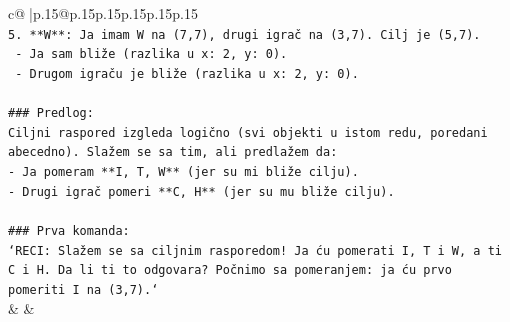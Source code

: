 \documentclass{article}
\begin{document}
{\begin{supertabular}{c@{$\;$}|p{.15\linewidth}@{}p{.15\linewidth}p{.15\linewidth}p{.15\linewidth}p{.15\linewidth}p{.15\linewidth}}
{{{\\ 
\texttt{5. **W**: Ja imam W na (7,7), drugi igrač na (3,7). Cilj je (5,7).} \\
\texttt{   {-} Ja sam bliže (razlika u x: 2, y: 0).} \\
\texttt{   {-} Drugom igraču je bliže (razlika u x: 2, y: 0).} \\
\\ 
\texttt{\#\#\# Predlog:} \\
\texttt{Ciljni raspored izgleda logično (svi objekti u istom redu, poredani abecedno). Slažem se sa tim, ali predlažem da:} \\
\texttt{{-} Ja pomeram **I, T, W** (jer su mi bliže cilju).} \\
\texttt{{-} Drugi igrač pomeri **C, H** (jer su mu bliže cilju).} \\
\\ 
\texttt{\#\#\# Prva komanda:} \\
\texttt{`RECI: Slažem se sa ciljnim rasporedom! Ja ću pomerati I, T i W, a ti C i H. Da li ti to odgovara? Počnimo sa pomeranjem: ja ću prvo pomeriti I na (3,7).`} \\
            }
        }
    }
    & & \\ \\


\end{supertabular}}
\end{document}
